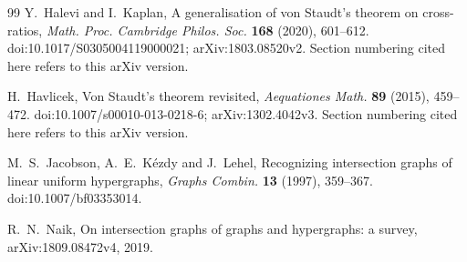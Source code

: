 \documentclass[11pt]{article}
\theoremstyle{definition}
\theoremstyle{remark}
\begin{document}
\begin{thebibliography}{99}
Y.~Halevi and I.~Kaplan,
\newblock A generalisation of von Staudt's theorem on cross-ratios,
\newblock \emph{Math. Proc. Cambridge Philos. Soc.} \textbf{168} (2020), 601--612.
\newblock doi:10.1017/S0305004119000021; arXiv:1803.08520v2.
Section numbering cited here refers to this arXiv version.

H.~Havlicek,
\newblock Von Staudt's theorem revisited,
\newblock \emph{Aequationes Math.} \textbf{89} (2015), 459--472.
\newblock doi:10.1007/s00010-013-0218-6; arXiv:1302.4042v3.
Section numbering cited here refers to this arXiv version.

M.~S.~Jacobson, A.~E.~K\'ezdy and J.~Lehel,
\newblock Recognizing intersection graphs of linear uniform hypergraphs,
\newblock \emph{Graphs Combin.} \textbf{13} (1997), 359--367.
\newblock doi:10.1007/bf03353014.

R.~N.~Naik,
\newblock On intersection graphs of graphs and hypergraphs: a survey,
\newblock arXiv:1809.08472v4, 2019.

\end{thebibliography}
\end{document}
